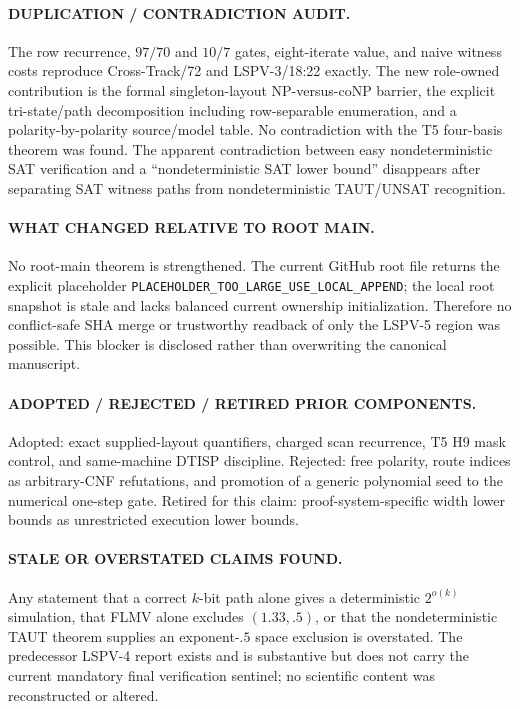 \documentclass[11pt]{article}
\begin{document}
\paragraph{DUPLICATION / CONTRADICTION AUDIT.}
The row recurrence, $97/70$ and $10/7$ gates, eight-iterate value, and naive witness costs reproduce Cross-Track/72 and LSPV-3/18:22 exactly.  The new role-owned contribution is the formal singleton-layout NP-versus-coNP barrier, the explicit tri-state/path decomposition including row-separable enumeration, and a polarity-by-polarity source/model table.  No contradiction with the T5 four-basis theorem was found.  The apparent contradiction between easy nondeterministic SAT verification and a ``nondeterministic SAT lower bound'' disappears after separating SAT witness paths from nondeterministic TAUT/UNSAT recognition.

\paragraph{WHAT CHANGED RELATIVE TO ROOT MAIN.}
No root-main theorem is strengthened.  The current GitHub root file returns the explicit placeholder \texttt{PLACEHOLDER\_TOO\_LARGE\_USE\_LOCAL\_APPEND}; the local root snapshot is stale and lacks balanced current ownership initialization.  Therefore no conflict-safe SHA merge or trustworthy readback of only the LSPV-5 region was possible.  This blocker is disclosed rather than overwriting the canonical manuscript.

\paragraph{ADOPTED / REJECTED / RETIRED PRIOR COMPONENTS.}
Adopted: exact supplied-layout quantifiers, charged scan recurrence, T5 H9 mask control, and same-machine DTISP discipline.  Rejected: free polarity, route indices as arbitrary-CNF refutations, and promotion of a generic polynomial seed to the numerical one-step gate.  Retired for this claim: proof-system-specific width lower bounds as unrestricted execution lower bounds.

\paragraph{STALE OR OVERSTATED CLAIMS FOUND.}
Any statement that a correct $k$-bit path alone gives a deterministic $2^{o(k)}$ simulation, that FLMV alone excludes $(1.33,.5)$, or that the nondeterministic TAUT theorem supplies an exponent-$.5$ space exclusion is overstated.  The predecessor LSPV-4 report exists and is substantive but does not carry the current mandatory final verification sentinel; no scientific content was reconstructed or altered.
\end{document}

